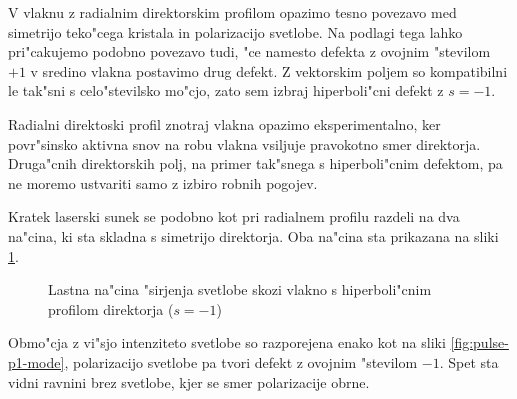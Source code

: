 \documentclass[a4paper,10pt]{article}
\begin{document}
V vlaknu z radialnim direktorskim profilom opazimo tesno povezavo med simetrijo teko"cega kristala in polarizacijo svetlobe. 
Na podlagi tega lahko pri"cakujemo podobno povezavo tudi, "ce namesto defekta z ovojnim "stevilom $+1$ v sredino vlakna postavimo drug defekt. 
Z vektorskim poljem so kompatibilni le tak"sni s celo"stevilsko mo"cjo, zato sem izbraj hiperboli"cni defekt z $s=-1$. 

Radialni direktoski profil znotraj vlakna opazimo eksperimentalno, ker povr"sinsko aktivna snov na robu vlakna vsiljuje pravokotno smer direktorja. 
Druga"cnih direktorskih polj, na primer tak"snega s hiperboli"cnim defektom, pa ne moremo ustvariti samo z izbiro robnih pogojev. 

Kratek laserski sunek se podobno kot pri radialnem profilu razdeli na dva na"cina, ki sta skladna s simetrijo direktorja. 
Oba na"cina sta prikazana na sliki \ref{fig:pulse-m1-mode}. 

\begin{figure}[!htbp]
 \centering
 \caption{Lastna na"cina "sirjenja svetlobe skozi vlakno s hiperboli"cnim profilom direktorja ($s=-1$)}
 \label{fig:pulse-m1-mode}
\end{figure}

Obmo"cja z vi"sjo intenziteto svetlobe so razporejena enako kot na sliki \ref{fig:pulse-p1-mode}, polarizacijo svetlobe pa tvori defekt z ovojnim "stevilom $-1$. 
Spet sta vidni ravnini brez svetlobe, kjer se smer polarizacije obrne. 
\end{document}
